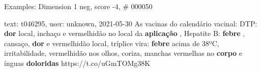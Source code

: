 \begin{frame}{Examples: Dimension 1 neg, score -4, \# 000050}
\footnotesize
\begin{alertblock}{text: t046295, user: unknown, 2021-05-30}
As vacinas do calendário vacinal: DTP: \textbf{dor} local, inchaço e 
vermelhidão no local da \textbf{aplicação} , Hepatite B: \textbf{febre} , 
cansaço, \textbf{dor} e vermelhidão local, tríplice vira: \textbf{febre} acima 
de 38ºC, irritabilidade, vermelhidão nos olhos, coriza, manchas vermelhas no 
\textbf{corpo} e ínguas \textbf{doloridas} https://t.co/uGmTOMg38K 
\end{alertblock}
\end{frame}
